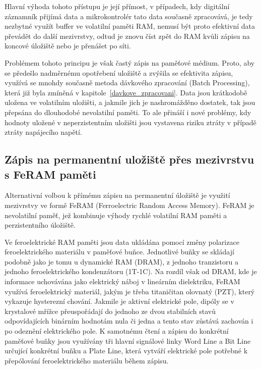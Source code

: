 Hlavní výhoda tohoto přístupu je její přímost, v případech, kdy digitální záznamník přijímá data a mikrokontrolér tato data současně zpracovává, je tedy nezbytné využít buffer ve volatilní paměti RAM, nemusí být proto efektivní data převádět do další mezivrstvy, odtud je znovu číst zpět do RAM kvůli zápisu na koncové úložiště nebo je přenášet po síti. 

Problémem tohoto principu je však častý zápis na paměťové médium. Proto, aby se předešlo nadměrnému opotřebení uložiště a zvýšila se efektivita zápisu, využívá se mnohdy současně metoda dávkového zpracování (Batch Processing), která již byla zmíněná v kapitole~\ref{davkove_zpracovani}. Data jsou krátkodobě uložena ve volatilním uložišti, a jakmile jich je nashromážděno dostatek, tak jsou přepsána do dlouhodobé nevolatilní paměti. To ale přináší i nové problémy, kdy hodnoty uložené v neperzistentním uložišti jsou vystavena riziku ztráty v případě ztráty napájecího napětí.

\subsection{Zápis na permanentní uložiště přes mezivrstvu s FeRAM paměti}
Alternativní volbou k přímému zápisu na permanentní úložiště je využití mezivrstvy ve formě FeRAM (Ferroelectric Random Access Memory). FeRAM je nevolatilní paměť, jež kombinuje výhody rychlé volatilní RAM paměti a perzistentního úložiště.

Ve feroelektrické RAM paměti jsou data ukládána pomocí změny polarizace feroelektrického materiálu v paměťové buňce. Jednotlivé buňky se skládají podobně jako je tomu u dynamické RAM (DRAM), z jednoho tranzistoru a jednoho feroelektrického kondenzátoru (1T-1C). Na rozdíl však od DRAM, kde je informace uchovávána jako elektrický náboj v lineárním dielektriku, FeRAM využívá feroelektrický materiál, jakým je třeba titaničitan olovnatý (PZT), který vykazuje hysterezní chování. Jakmile je aktivní elektrické pole, dipóly se v krystalové mřížce přeuspořádají do jednoho ze dvou stabilních stavů odpovídajících binárním hodnotám nula či jedna a tento stav zůstává zachován i po odeznění elektrického pole. K samotnému čtení a zápisu do konkrétní paměťové buňky jsou využívány tři hlavní signálové linky Word Line a Bit Line určující konkrétní buňku a Plate Line, která vytváří elektrické pole potřebné k přepólování feroelektrického materiálu během zápisu. \cite{ieee_feram_ultra_high_density_embedded_mem}


